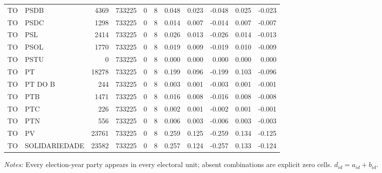 \begin{landscape}
\begin{longtable}{llrrrrrrrrr}
TO & PSDB & 4369 & 733225 & 0 & 8 & 0.048 & 0.023 & -0.048 & 0.025 & -0.023 \\
TO & PSDC & 1298 & 733225 & 0 & 8 & 0.014 & 0.007 & -0.014 & 0.007 & -0.007 \\
TO & PSL & 2414 & 733225 & 0 & 8 & 0.026 & 0.013 & -0.026 & 0.014 & -0.013 \\
TO & PSOL & 1770 & 733225 & 0 & 8 & 0.019 & 0.009 & -0.019 & 0.010 & -0.009 \\
TO & PSTU & 0 & 733225 & 0 & 8 & 0.000 & 0.000 & 0.000 & 0.000 & 0.000 \\
TO & PT & 18278 & 733225 & 0 & 8 & 0.199 & 0.096 & -0.199 & 0.103 & -0.096 \\
TO & PT DO B & 244 & 733225 & 0 & 8 & 0.003 & 0.001 & -0.003 & 0.001 & -0.001 \\
TO & PTB & 1471 & 733225 & 0 & 8 & 0.016 & 0.008 & -0.016 & 0.008 & -0.008 \\
TO & PTC & 226 & 733225 & 0 & 8 & 0.002 & 0.001 & -0.002 & 0.001 & -0.001 \\
TO & PTN & 556 & 733225 & 0 & 8 & 0.006 & 0.003 & -0.006 & 0.003 & -0.003 \\
TO & PV & 23761 & 733225 & 0 & 8 & 0.259 & 0.125 & -0.259 & 0.134 & -0.125 \\
TO & SOLIDARIEDADE & 23582 & 733225 & 0 & 8 & 0.257 & 0.124 & -0.257 & 0.133 & -0.124 \\
\end{longtable}
\noindent\footnotesize\textit{Notes:} Every election-year party appears in every electoral unit; absent combinations are explicit zero cells. \(d_{id}=a_{id}+b_{id}\).
\endgroup
\end{landscape}

